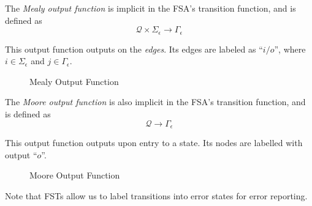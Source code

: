 \begin{definition}
    The \textit{Mealy output function} is implicit in the FSA's transition function, and is defined as
    \begin{equation}
        \mathcal{Q} \times \Sigma_{\epsilon} \to \Gamma_{\epsilon}
    \end{equation}
    
    This output function outputs on the \textit{edges}. Its edges are labeled as \enquote{$i/o$}, where $i \in \Sigma_{\epsilon}$ and $j \in \Gamma_{\epsilon}$.
    
    \begin{figure}[H]
        \centering
        \caption{Mealy Output Function}
        \label{fig:fst-mealy}
    \end{figure}
\end{definition}

\begin{definition}
    The \textit{Moore output function} is also implicit in the FSA's transition function, and is defined as
    \begin{equation}
        \mathcal{Q} \to \Gamma_{\epsilon}
    \end{equation}
    
    This output function outputs upon entry to a state. Its nodes are labelled with output \enquote{$o$}.
    
    \begin{figure}[H]
        \centering
        \caption{Moore Output Function}
        \label{fig:fst-moore}
    \end{figure}
\end{definition}

\begin{remark}
    Note that FSTs allow us to label transitions into error states for error reporting.
\end{remark}
